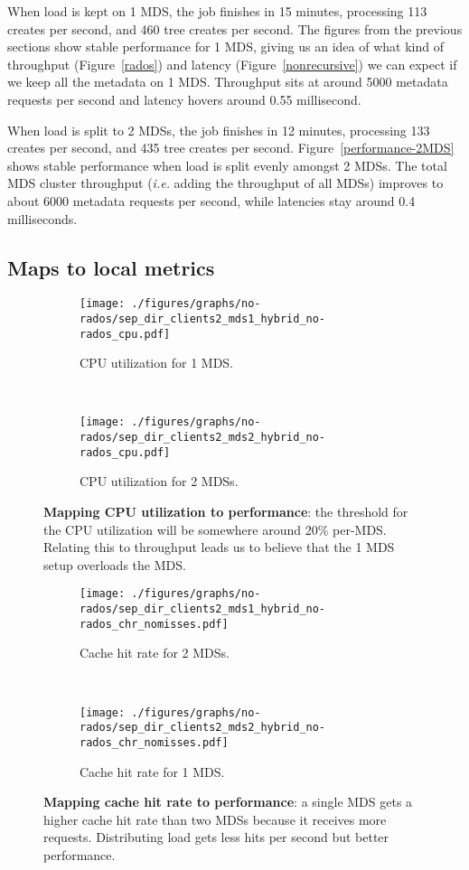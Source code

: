 When load is kept on 1 MDS, the job finishes in 15 minutes, processing 113 creates per second, and 460 tree creates per second. The figures from the previous sections show stable performance for 1 MDS, giving us an idea of what kind of throughput (Figure~\ref{rados}) and latency (Figure~\ref{nonrecursive}) we can expect if we keep all the metadata on 1 MDS. Throughput sits at around 5000 metadata requests per second and latency hovers around 0.55 millisecond. 

When load is split to 2 MDSs, the job finishes in 12 minutes, processing 133 creates per second, and 435 tree creates per second. Figure~\ref{performance-2MDS} shows stable performance when load is split evenly amongst 2 MDSs. The total MDS cluster throughput ({\it i.e.} adding the throughput of all MDSs) improves to about 6000 metadata requests per second, while latencies stay around 0.4 milliseconds. 

\subsection{Maps to local metrics}
\begin{figure*}[tbh]
	\begin{subfigure}[H]{0.5\textwidth}
	\centering
	\texttt{[image: ./figures/graphs/no-rados/sep\_dir\_clients2\_mds1\_hybrid\_no-rados\_cpu.pdf]}
	\caption{CPU utilization for 1 MDS.}
	\end{subfigure}
	~
	\begin{subfigure}[H]{0.5\textwidth}
	\centering	
	\texttt{[image: ./figures/graphs/no-rados/sep\_dir\_clients2\_mds2\_hybrid\_no-rados\_cpu.pdf]} 
	\caption{CPU utilization for 2 MDSs.}
	\end{subfigure}	
	\caption{\textbf{Mapping CPU utilization to performance}: the threshold for the CPU utilization will be somewhere around 20\% per-MDS. Relating this to throughput leads us to believe that the 1 MDS setup overloads the MDS.\label{metrics-cpu}}
\end{figure*}

\begin{figure*}[tbh]
	\begin{subfigure}[H]{0.5\textwidth}
	\centering
	\texttt{[image: ./figures/graphs/no-rados/sep\_dir\_clients2\_mds1\_hybrid\_no-rados\_chr\_nomisses.pdf]} 	
	\caption{Cache hit rate for 2 MDSs.}
	\end{subfigure}
	~
	\begin{subfigure}[H]{0.5\textwidth}
	\centering	
	\texttt{[image: ./figures/graphs/no-rados/sep\_dir\_clients2\_mds2\_hybrid\_no-rados\_chr\_nomisses.pdf]}
	\caption{Cache hit rate for 1 MDS.}
	\end{subfigure}	
	\caption{\textbf{Mapping cache hit rate to performance}: a single MDS gets a higher cache hit rate than two MDSs because it receives more requests. Distributing load gets less hits per second but better performance. \label{metrics-chr}}
\end{figure*}

